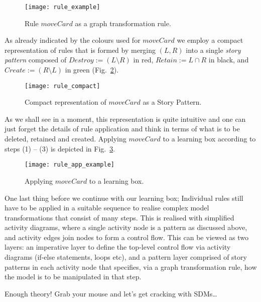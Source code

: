 \begin{figure}[htp]
\begin{center}
  \texttt{[image: rule\_example]}
  \caption[]{Rule $moveCard$ as a graph transformation rule.}	
  \label{fig:rule_example}
\end{center}
\end{figure}

As already indicated by the colours used for $moveCard$ we employ a compact representation of rules that is formed by merging $(L,R)$ into a single \emph{story
pattern} composed of  $Destroy := (L\setminus R)$ in red, $Retain :=  L\cap R$ in black, and $Create := (R\setminus L)$ in  green (Fig.~\ref{fig:rule_compact}).

\begin{figure}[htp]
\begin{center}
  \texttt{[image: rule\_compact]}
  \caption[]{Compact representation of $moveCard$ as a Story Pattern.}
  \label{fig:rule_compact}
\end{center}
\end{figure}

As we shall see in a moment, this  representation is quite intuitive and one can just forget the details of rule application and think in terms of what is to be
deleted, retained and created. Applying $moveCard$ to a learning box according to steps (1) -- (3) is depicted in Fig.~\ref{fig:rule_app_example}.

\begin{figure}[htp] 
\begin{center}
  \texttt{[image: rule\_app\_example]}
  \caption[]{Applying $moveCard$ to a learning box.}
  \label{fig:rule_app_example}
\end{center}
\end{figure}

One last thing before we continue with our learning box; Individual rules still have to be applied in a suitable sequence to realise complex model
transformations that consist of many steps.  This is realised with simplified activity diagrams, where a single activity node is a pattern as discussed above,
and activity edges join nodes to form a control flow. This can be viewed as two layers:  an imperative layer to define the top-level control flow via activity
diagrams (if-else statements, loops etc), and a pattern layer comprised of story patterns in each activity node that specifies, via a graph transformation
rule, how the model is to be manipulated in that step.

Enough theory! Grab your mouse and let's get cracking with SDMs\ldots